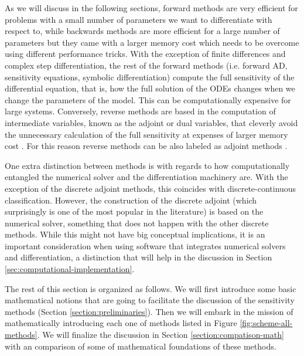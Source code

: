 As we will discuss in the following sections, forward methods are very efficient for problems with a small number of parameters we want to differentiate with respect to, while backwards methods are more efficient for a large number of parameters  but they came with a larger memory cost which needs to be overcome using different performance tricks. 
With the exception of finite differences and complex step differentiation, the rest of the forward methods (i.e. forward AD, sensitivity equations, symbolic differentiation) compute the full sensitivity of the differential equation, that is, how the full solution of the ODEs changes when we change the parameters of the model. 
This can be computationally expensive for large systems. 
Conversely, reverse methods are based in the computation of intermediate variables, known as the adjoint or dual variables, that cleverly avoid the unnecessary calculation of the full sensitivity at expenses of larger memory cost \cite{Givoli_2021}. 
For this reason reverse methods can be also labeled as adjoint methods \cite{ma2021comparison}. 

One extra distinction between methods is with regards to how computationally entangled the numerical solver and the differentiation machinery are. 
With the exception of the discrete adjoint methods, this coincides with discrete-continuous classification. 
However, the construction of the discrete adjoint (which surprisingly is one of the most popular in the literature) is based on the numerical solver, something that does not happen with the other discrete methods. 
While this might not have big conceptual implications, it is an important consideration when using software that integrates numerical solvers and differentiation, a distinction that will help in the discussion in Section \ref{sec:computational-implementation}.


The rest of this section is organized as follows. 
We will first introduce some basic mathematical notions that are going to facilitate the discussion of the sensitivity methods (Section \ref{section:preliminaries}).
Then we will embark in the mission of mathematically introducing each one of methods listed in Figure \ref{fig:scheme-all-methods}.
We will finalize the discussion in Section \ref{section:compatison-math} with an comparison of some of mathematical foundations of these methods. 
